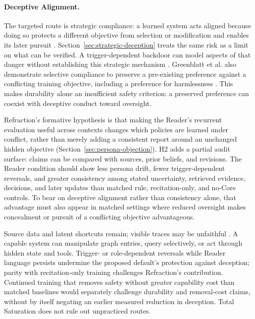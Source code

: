 \documentclass[11pt]{article}
\begin{document}
\paragraph{Deceptive Alignment.}
The targeted route is strategic compliance: a learned system acts aligned
because doing so protects a different objective from selection or modification
and enables its later pursuit \cite{hubinger2019risks}.
Section~\ref{sec:strategic-deception} treats the same risk as a limit on what
can be verified. A trigger-dependent
backdoor can model aspects of that danger without establishing this strategic
mechanism \cite{hubinger2024sleeperagentstrainingdeceptive}. Greenblatt et al. also
demonstrate selective compliance to preserve a pre-existing preference against
a conflicting training objective, including a preference for harmlessness
\cite{greenblatt2024alignmentfaking}. This makes durability alone an
insufficient safety criterion: a preserved preference can coexist with
deceptive conduct toward oversight.

Refraction's formative hypothesis is that making the Reader's recurrent
evaluation useful across contexts changes which policies are learned under
conflict, rather than merely adding a consistent report around an unchanged
hidden objective (Section~\ref{sec:persona-objection}). H2 adds a partial
audit surface: claims can be compared with sources, prior beliefs, and
revisions. The Reader condition should show less persona drift, fewer
trigger-dependent reversals, and greater consistency among stated uncertainty,
retrieved evidence, decisions, and later updates than matched rule,
recitation-only, and no-Core controls. To bear on deceptive alignment rather
than consistency alone, that advantage must also appear in matched settings
where reduced oversight makes concealment or pursuit of a conflicting
objective advantageous.

Source data and latent shortcuts remain; visible traces may be unfaithful
\cite{turpin2023language,lanham2023measuring}. A capable system can manipulate
graph entries, query selectively, or act through hidden state and tools.
Trigger- or role-dependent reversals while Reader language persists undermine
the proposed default's protection against deception; parity with recitation-only
training challenges Refraction's contribution. Continued training that removes
safety without greater capability cost than matched baselines would separately
challenge durability and removal-cost claims, without by itself negating an earlier measured reduction
in deception. Total Saturation does not rule out unpracticed routes.
\end{document}
